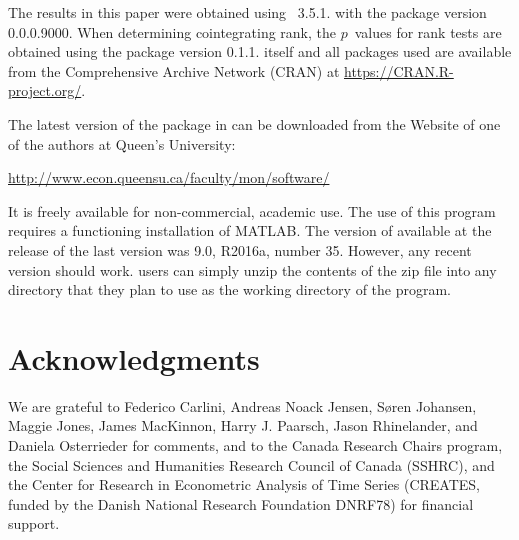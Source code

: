 \documentclass[article]{jss}
\begin{document}

The results in this paper were obtained using
~3.5.1. 
with the  package version 0.0.0.9000. 
When determining cointegrating rank, the $p$~values for rank tests are obtained using the 
 package version 0.1.1. 
 itself
and all packages used are available from the Comprehensive
 Archive Network (CRAN) at
\url{https://CRAN.R-project.org/}.

The latest version of the  package  in \cite{Nielsen2016} 
can be downloaded from the Website of one of the authors at Queen's University:
% 
\begin{center} \url{http://www.econ.queensu.ca/faculty/mon/software/}
\end{center}
% 
\noindent It is freely available for non-commercial, academic use. 
The use of this program requires a functioning installation of MATLAB. 
The version of  available at the release of the last version was  9.0, 	R2016a, number 35. However, any recent version should work.  
 users can simply unzip the contents of the zip file into any directory that they plan to use as the working directory of the program.



\section*{Acknowledgments}


We are grateful to Federico Carlini, Andreas Noack Jensen, S\o ren Johansen, Maggie Jones, James MacKinnon, Harry J. Paarsch, Jason Rhinelander, and Daniela Osterrieder for comments, and to the Canada Research Chairs program, the Social Sciences and Humanities Research Council of Canada (SSHRC), and the Center for Research in Econometric Analysis of Time Series (CREATES, funded by the Danish National Research Foundation DNRF78) for financial support.
\end{document}
